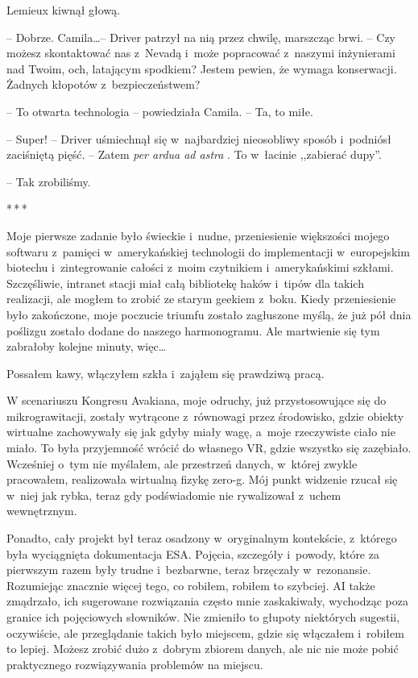 \documentclass[oneside,polish,12pt,sfheadings]{mwbk}
\newcommand{\threeast}{\bigskip\par\centerline{*\,*\,*}\medskip\par}%
\begin{document}
Lemieux kiwnął głową.

-- Dobrze. Camila\ldots-- Driver patrzył na nią przez chwilę, marszcząc
brwi. -- Czy możesz skontaktować nas z~Nevadą i~może popracować z~naszymi
inżynierami nad Twoim, och, latającym spodkiem? Jestem pewien, że wymaga
konserwacji. Żadnych kłopotów z~bezpieczeństwem?

-- To otwarta technologia -- powiedziała Camila. -- Ta, to miłe.

-- Super! -- Driver uśmiechnął się w~najbardziej nieosobliwy sposób i~podniósł zaciśniętą pięść. -- Zatem \emph{per ardua ad astra }. To w~łacinie ,,zabierać dupy''. 

-- Tak zrobiliśmy.

\threeast

Moje pierwsze zadanie było świeckie i~nudne, przeniesienie większości
mojego softwaru z~pamięci w~amerykańskiej technologii do implementacji w~europejskim biotechu i~zintegrowanie całości z~moim czytnikiem i~amerykańskimi szkłami. Szczęśliwie, intranet stacji miał całą bibliotekę
haków i~tipów dla takich realizacji, ale mogłem to zrobić ze starym
geekiem z~boku. Kiedy przeniesienie było zakończone, moje poczucie
triumfu zostało zagłuszone myślą, że już pół dnia poślizgu zostało
dodane do naszego harmonogramu. Ale martwienie się tym zabrałoby kolejne
minuty, więc\ldots

Possałem kawy, włączyłem szkła i~zająłem się prawdziwą pracą.

W scenariuszu Kongresu Avakiana, moje odruchy, już przystosowujące się
do mikrograwitacji, zostały wytrącone z~równowagi przez środowisko,
gdzie obiekty wirtualne zachowywały się jak gdyby miały wagę, a~moje
rzeczywiste ciało nie miało. To była przyjemność wrócić do własnego VR,
gdzie wszystko się zazębiało. Wcześniej o~tym nie myślałem, ale
przestrzeń danych, w~której zwykle pracowałem, realizowała wirtualną
fizykę zero-g. Mój punkt widzenie rzucał się w~niej jak rybka, teraz gdy
podświadomie nie rywalizował z~uchem wewnętrznym.

Ponadto, cały projekt był teraz osadzony w~oryginalnym kontekście, z~którego była wyciągnięta dokumentacja ESA. Pojęcia, szczegóły i~powody,
które za pierwszym razem były trudne i~bezbarwne, teraz brzęczały w~rezonansie. Rozumiejąc znacznie więcej tego, co robiłem, robiłem to
szybciej. AI także zmądrzało, ich sugerowane rozwiązania często mnie
zaskakiwały, wychodząc poza granice ich pojęciowych słowników. Nie
zmieniło to głupoty niektórych sugestii, oczywiście, ale przeglądanie
takich było miejscem, gdzie się włączałem i~robiłem to lepiej. Możesz
zrobić dużo z~dobrym zbiorem danych, ale nic nie może pobić praktycznego
rozwiązywania problemów na miejscu.
\end{document}

